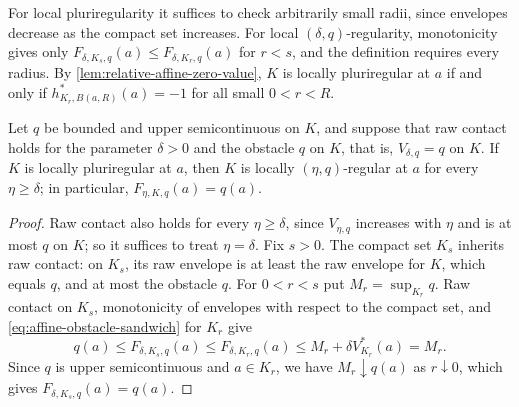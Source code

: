 For local pluriregularity it suffices to check arbitrarily small radii, since envelopes decrease as the compact set increases. For local $(\delta,q)$-regularity, monotonicity gives only $F_{\delta,K_s,q}(a)\leq F_{\delta,K_r,q}(a)$ for $r<s$, and the definition requires every radius. By \cref{lem:relative-affine-zero-value}, $K$ is locally pluriregular at $a$ if and only if $h_{K_r,B(a,R)}^*(a)=-1$ for all small $0<r<R$.

\begin{lemma}\label{lem:affine-local-weighted-regularity}
Let $q$ be bounded and upper semicontinuous on $K$, and suppose that raw contact holds for the parameter $\delta>0$ and the obstacle $q$ on $K$, that is, $V_{\delta,q}=q$ on $K$. If $K$ is locally pluriregular at $a$, then $K$ is locally $(\eta,q)$-regular at $a$ for every $\eta\geq\delta$; in particular, $F_{\eta,K,q}(a)=q(a)$.
\end{lemma}
\begin{proof}
Raw contact also holds for every $\eta\geq\delta$, since $V_{\eta,q}$ increases with $\eta$ and is at most $q$ on $K$; so it suffices to treat $\eta=\delta$. Fix $s>0$. The compact set $K_s$ inherits raw contact: on $K_s$, its raw envelope is at least the raw envelope for $K$, which equals $q$, and at most the obstacle $q$. For $0<r<s$ put $M_r=\sup_{K_r}q$. Raw contact on $K_s$, monotonicity of envelopes with respect to the compact set, and \eqref{eq:affine-obstacle-sandwich} for $K_r$ give
\[
 q(a)\leq F_{\delta,K_s,q}(a)
 \leq F_{\delta,K_r,q}(a)
 \leq M_r+\delta V_{K_r}^*(a)=M_r.
\]
Since $q$ is upper semicontinuous and $a\in K_r$, we have $M_r\downarrow q(a)$ as $r\downarrow0$, which gives $F_{\delta,K_s,q}(a)=q(a)$.
\end{proof}

